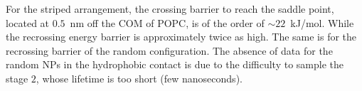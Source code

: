 For the striped arrangement, the crossing barrier to reach the saddle point, located at $0.5$~nm off the \ac{COM} 
of \ac{POPC}, is of the order of $\sim 22$~kJ/mol. While the recrossing energy barrier is approximately twice as 
high. The same is for the recrossing barrier of the random configuration. The absence of data for the random 
\acp{NP} in the hydrophobic contact is due to the difficulty to sample the stage $2$, whose lifetime is too short 
(few nanoseconds).

